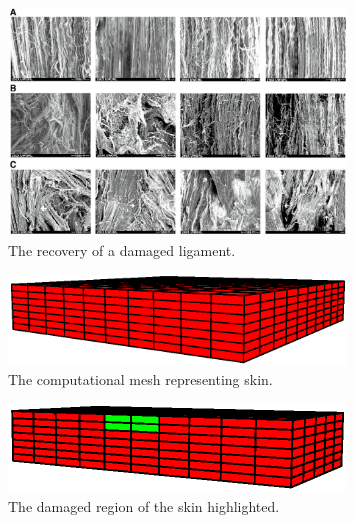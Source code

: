 
\begin{figure}[!hpt]
\centering
\includegraphics[width=0.8\textwidth]
                {images/experiments/healing-damaged-ligament} 
\caption{The recovery of a damaged ligament.}
\label{healing-damaged-ligament}
\end{figure}

\begin{figure}[!hpt]
\centering
\includegraphics[width=0.8\textwidth]
                {images/examples/lagrangian/healing/full-skin-mesh} 
\caption{The computational mesh representing skin.}
\label{healing-skin-mesh}
\end{figure}

\begin{figure}[!hpt]
\centering
\includegraphics[width=0.8\textwidth]
                {images/examples/lagrangian/healing/damaged-region} 
\caption{The damaged region of the skin highlighted.}
\label{healing-damaged-region}
\end{figure}

